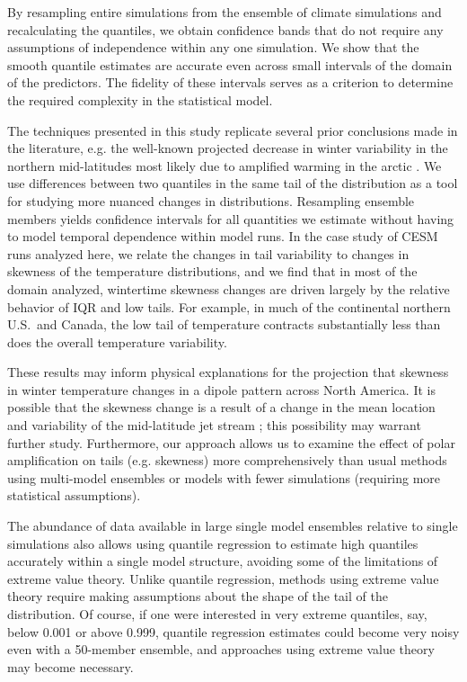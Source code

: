 \documentclass{ametsoc}
\begin{document}
By resampling entire simulations from the ensemble of climate simulations and recalculating the quantiles, we obtain confidence bands that do not require any assumptions of independence within any one simulation. We show that the smooth quantile estimates are accurate even across small intervals of the domain of the predictors. The fidelity of these intervals serves as a criterion to determine the required complexity in the statistical model.

The techniques presented in this study replicate several prior conclusions made in the literature, e.g. the well-known projected decrease in winter variability in the northern mid-latitudes \citep[e.g.][]{schneider2015physics} most likely due to amplified warming in the arctic \citep{screen2014arctic}. {We use differences between two quantiles in the same tail of the distribution as a tool for studying more nuanced changes in distributions. Resampling ensemble members yields confidence intervals for all quantities we estimate without having to model temporal dependence within model runs.} In the case study of CESM runs analyzed here, we relate the changes in tail variability to changes in skewness of the temperature distributions, and we find that in most of the domain analyzed, wintertime skewness changes are driven largely by the relative behavior of IQR and low tails. For example, in much of the continental northern U.S.\ and Canada, the low tail of temperature contracts substantially less than does the overall temperature variability. 

These results may inform physical explanations for 
the projection that skewness in winter temperature changes in a dipole pattern across North America. It is possible that the skewness change is a result of a change in the mean location and variability of the mid-latitude jet stream \citep[e.g.][]{barnes2013response}; this possibility may warrant further study. Furthermore, our approach allows us to examine the effect of polar amplification on tails (e.g. skewness) more comprehensively than usual methods using multi-model ensembles or models with fewer simulations (requiring more statistical assumptions).

The abundance of data available in large single model ensembles relative to single simulations also allows using quantile regression to estimate high quantiles accurately within a single model structure, avoiding some of the limitations of extreme value theory. Unlike quantile regression, methods using extreme value theory require making assumptions about the shape of the tail of the distribution. {Of course, if one were interested in very extreme quantiles, say, below 0.001 or above 0.999, quantile regression estimates could become very noisy even with a 50-member ensemble, and approaches using extreme value theory may become necessary.}
\end{document}
